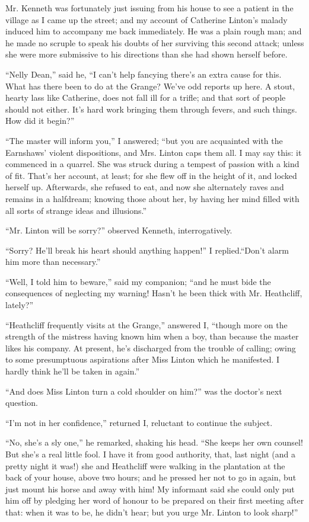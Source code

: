 \par Mr. Kenneth was fortunately just issuing from his house to see a patient in the village as I came up the street; and my account of Catherine Linton's malady induced him to accompany me back immediately. He was a plain rough man; and he made no scruple to speak his doubts of her surviving this second attack; unless she were more submissive to his directions than she had shown herself before.
\par “Nelly Dean,” said he, “I can't help fancying there's an extra cause for this. What has there been to do at the Grange? We've odd reports up here. A stout, hearty lass like Catherine, does not fall ill for a trifle; and that sort of people should not either. It's hard work bringing them through fevers, and such things. How did it begin?”
\par “The master will inform you,” I answered; “but you are acquainted with the Earnshaws' violent dispositions, and Mrs. Linton caps them all. I may say this: it commenced in a quarrel. She was struck during a tempest of passion with a kind of fit. That's her account, at least; for she flew off in the height of it, and locked herself up. Afterwards, she refused to eat, and now she alternately raves and remains in a halfdream; knowing those about her, by having her mind filled with all sorts of strange ideas and illusions.”
\par “Mr. Linton will be sorry?” observed Kenneth, interrogatively.
\par “Sorry? He'll break his heart should anything happen!” I replied.“Don't alarm him more than necessary.”
\par “Well, I told him to beware,” said my companion; “and he must bide the consequences of neglecting my warning! Hasn't he been thick with Mr. Heathcliff, lately?”
\par “Heathcliff frequently visits at the Grange,” answered I, “though more on the strength of the mistress having known him when a boy, than because the master likes his company. At present, he's discharged from the trouble of calling; owing to some presumptuous aspirations after Miss Linton which he manifested. I hardly think he'll be taken in again.”
\par “And does Miss Linton turn a cold shoulder on him?” was the doctor's next question.
\par “I'm not in her confidence,” returned I, reluctant to continue the subject.
\par “No, she's a sly one,” he remarked, shaking his head. “She keeps her own counsel! But she's a real little fool. I have it from good authority, that, last night (and a pretty night it was!) she and Heathcliff were walking in the plantation at the back of your house, above two hours; and he pressed her not to go in again, but just mount his horse and away with him! My informant said she could only put him off by pledging her word of honour to be prepared on their first meeting after that: when it was to be, he didn't hear; but you urge Mr. Linton to look sharp!”
